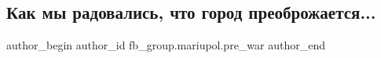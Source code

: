  
 
 
 
 

\subsection{Как мы радовались, что город преоброжается...}
\label{sec:14_02_2023.fb.fb_group.mariupol.pre_war.3.kak_mi_radovalis__ch}

\ifcmt
 author_begin
   author_id fb_group.mariupol.pre_war
 author_end
\fi
